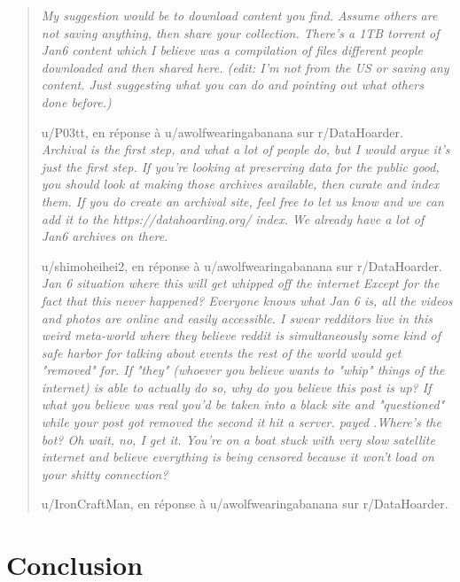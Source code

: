 \begin{quote}

\textit{My suggestion would be to download content you find. Assume others are not saving anything, then share your collection.
There's a 1TB torrent of Jan6 content which I believe was a compilation of files different people downloaded and then shared here.
(edit: I'm not from the US or saving any content. Just suggesting what you can do and pointing out what others done before.)}

u/P03tt, en réponse à u/awolfwearingabanana sur r/DataHoarder.\\

\textit{Archival is the first step, and what a lot of people do, but I would argue it's just the first step. If you're looking at preserving data for the public good, you should look at making those archives available, then curate and index them. If you do create an archival site, feel free to let us know and we can add it to the https://datahoarding.org/ index. We already have a lot of Jan6 archives on there. }

u/shimoheihei2, en réponse à u/awolfwearingabanana sur r/DataHoarder.\\

\textit{Jan 6 situation where this will get whipped off the internet
Except for the fact that this never happened? Everyone knows what Jan 6 is, all the videos and photos are online and easily accessible.
I swear redditors live in this weird meta-world where they believe reddit is simultaneously some kind of safe harbor for talking about events the rest of the world would get "removed" for. If "they" (whoever you believe wants to "whip" things of the internet) is able to actually do so, why do you believe this post is up? If what you believe was real you'd be taken into a black site and "questioned" while your post got removed the second it hit a server. payed .Where's the bot? Oh wait, no, I get it. You're on a boat stuck with very slow satellite internet and believe everything is being censored because it won't load on your shitty connection?}

u/IronCraftMan, en réponse à u/awolfwearingabanana sur r/DataHoarder.\\

\end{quote}

\section{Conclusion}

